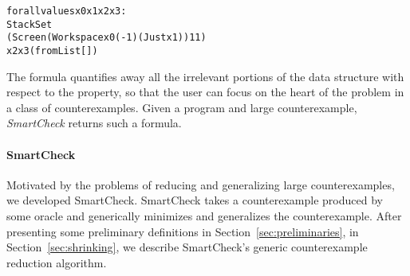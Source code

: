 \documentclass{sigplanconf}
\newenvironment{code}{\begin{alltt}\footnotesize}{\end{alltt}}
\newcommand{\ttp}[1]{\texttt{#1}}
\begin{document}


%
\begin{samepage}
\begin{code}
forall values x0 x1 x2 x3:
  StackSet
    (Screen (Workspace x0 (-1) (Just x1)) 1 1)
    x2 x3 (fromList [])
\end{code}
\end{samepage}
%
\noindent
The formula quantifies away all the irrelevant portions of the data structure
with respect to the property, so that the user can focus on the heart of the
problem in a class of counterexamples.  Given a program and large
counterexample, \emph{SmartCheck} returns such a formula.

\paragraph{SmartCheck}
Motivated by the problems of reducing and generalizing large counterexamples, we
developed SmartCheck.  SmartCheck takes a counterexample produced by some oracle
and generically minimizes and generalizes the counterexample.  After presenting
some preliminary definitions in Section~\ref{sec:preliminaries}, in
Section~\ref{sec:shrinking}, we describe SmartCheck's generic counterexample
reduction algorithm.


\end{document}
